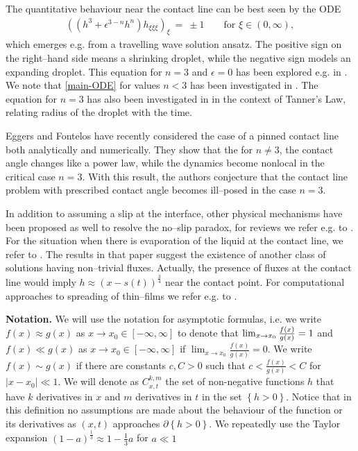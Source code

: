\documentclass[pagesize,pdftex]{amsart}
\newcommand{\eps}{\epsilon}
\begin{document}
\medskip

The quantitative behaviour near the contact line can be best seen by the ODE 
\begin{align} \label{main-ODE} %
  ((h^3+ \eps^{3-n} h^{n})h_{\xi\xi\xi})_\xi  \ %
  = \ \pm 1\qquad \text{for $\xi \in  (0,\infty )$},
\end{align}%
which emerges e.g. from a travelling wave solution ansatz. The positive sign on
the right--hand side means a shrinking droplet, while the negative sign models
an expanding droplet. This equation for $n=3$ and $\eps =0$ has been explored
e.g. in \cite[eqs. (4.3.9),(4.3.23)]{BenderOrszag-Book}. We note that
\eqref{main-ODE} for values $n<3$ has been investigated in \cite[$r = 1$
corresponds to $m = 3$]{BoattoEtal-1993}. The equation for $n=3$ has also been
investigated in \cite{DuffyWilson-1997} in the context of Tanner's Law, relating
radius of the droplet with the time.

\medskip

Eggers and Fontelos \cite{EggersFontelos-2025} have recently considered the case of a pinned contact line
both analytically and numerically. They show that the
for $n \neq 3$, the contact angle changes like a power law, while the dynamics
become nonlocal in the critical case $n = 3$. With this result, the authors
conjecture that the contact line problem with prescribed contact angle becomes
ill--posed in the case $n = 3$.

\medskip

In addition to assuming a slip at the interface, other physical mechanisms have
been proposed as well to resolve the no--slip paradox, for reviews we refer
e.g. to \cite%
{BDQ-Book,OronDavisBankoff-1997,BonnEggersEtal-2009,SnoeijerAndreotti-2013,Shikhmurzaev-2020,DurastantiGiacomelli-2024}.
For the situation when there is evaporation of the liquid at the contact line,
we refer to \cite{RednikovColinet-2020}.  The results in that paper suggest the
existence of another class of solutions having non--trivial fluxes. Actually,
the presence of fluxes at the contact line would imply
$h\approx (x-s(t))^{\frac 34}$ near the contact point.  For computational
approaches to spreading of thin--films we refer e.g. to
\cite{BarrettBloweyGarcke-1998,MuenchWagnerWitelski-2025,Peschka-2015,Peschka-2018,PeschkaHeltai-2022}.

\medskip

\textbf{Notation.}  We will use the notation for asymptotic formulas, i.e. we
write $%
f(x) \approx g(x)$ as $x\to x_{0}\in [ -\infty ,\infty] $ to denote that
$\lim_{x\to x_{0}}\frac{%
  f(x) }{g(x) } =1$ and $f(x) \ll g(x)$ as $x\to x_{0}\in [ -\infty ,\infty] $
if $%
\lim_{x\to x_{0}}\frac{f(x) }{g(x)} =0$. We write $f(x) \sim g(x)$ if there are
constants $c,C > 0$ such that $c < \frac{f(x) }{g(x)} < C$ for $|x-x_0| \ll
1$. We will denote as $C_{x,t}^{k,m}$ the set of non-negative functions $h$ that
have $k$ derivatives in $x$ and $m$ derivatives in $t$ in the set
$\left\{ h>0\right\} $.  Notice that in this definition no assumptions are made
about the behaviour of the function or its derivatives as $(x,t)$ approaches
$\partial \left\{ h>0\right\}$. We repeatedly use the Taylor expansion
$(1-a)^{\frac 13} \approx 1 - \frac 13 a$ for $a \ll 1$
\end{document}
